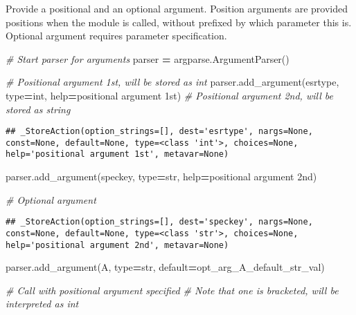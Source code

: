 \documentclass[
]{book}
\newenvironment{Shaded}{\begin{snugshade}}{\end{snugshade}}
\newcommand{\BuiltInTok}[1]{#1}
\newcommand{\CommentTok}[1]{\textcolor[rgb]{0.56,0.35,0.01}{\textit{#1}}}
\newcommand{\NormalTok}[1]{#1}
\newcommand{\OperatorTok}[1]{\textcolor[rgb]{0.81,0.36,0.00}{\textbf{#1}}}
\newcommand{\StringTok}[1]{\textcolor[rgb]{0.31,0.60,0.02}{#1}}
\begin{document}
Provide a positional and an optional argument. Position arguments are provided positions when the module is called, without prefixed by which parameter this is. Optional argument requires parameter specification.

\begin{Shaded}
\begin{Highlighting}[]
\CommentTok{\# Start parser for arguments}
\NormalTok{parser }\OperatorTok{=}\NormalTok{ argparse.ArgumentParser()}

\CommentTok{\# Positional argument 1st, will be stored as int}
\NormalTok{parser.add\_argument(}\StringTok{\textquotesingle{}esrtype\textquotesingle{}}\NormalTok{, }\BuiltInTok{type}\OperatorTok{=}\BuiltInTok{int}\NormalTok{, }\BuiltInTok{help}\OperatorTok{=}\StringTok{\textquotesingle{}positional argument 1st\textquotesingle{}}\NormalTok{)}
\CommentTok{\# Positional argument 2nd, will be stored as string}
\end{Highlighting}
\end{Shaded}

\begin{verbatim}
## _StoreAction(option_strings=[], dest='esrtype', nargs=None, const=None, default=None, type=<class 'int'>, choices=None, help='positional argument 1st', metavar=None)
\end{verbatim}

\begin{Shaded}
\begin{Highlighting}[]
\NormalTok{parser.add\_argument(}\StringTok{\textquotesingle{}speckey\textquotesingle{}}\NormalTok{, }\BuiltInTok{type}\OperatorTok{=}\BuiltInTok{str}\NormalTok{, }\BuiltInTok{help}\OperatorTok{=}\StringTok{\textquotesingle{}positional argument 2nd\textquotesingle{}}\NormalTok{)}

\CommentTok{\# Optional argument}
\end{Highlighting}
\end{Shaded}

\begin{verbatim}
## _StoreAction(option_strings=[], dest='speckey', nargs=None, const=None, default=None, type=<class 'str'>, choices=None, help='positional argument 2nd', metavar=None)
\end{verbatim}

\begin{Shaded}
\begin{Highlighting}[]
\NormalTok{parser.add\_argument(}\StringTok{\textquotesingle{}{-}A\textquotesingle{}}\NormalTok{, }\BuiltInTok{type}\OperatorTok{=}\BuiltInTok{str}\NormalTok{, default}\OperatorTok{=}\StringTok{\textquotesingle{}opt\_arg\_A\_default\_str\_val\textquotesingle{}}\NormalTok{)}

\CommentTok{\# Call with positional argument specified}
\CommentTok{\# Note that one is bracketed, will be interpreted as int}
\end{Highlighting}
\end{Shaded}
\end{document}
